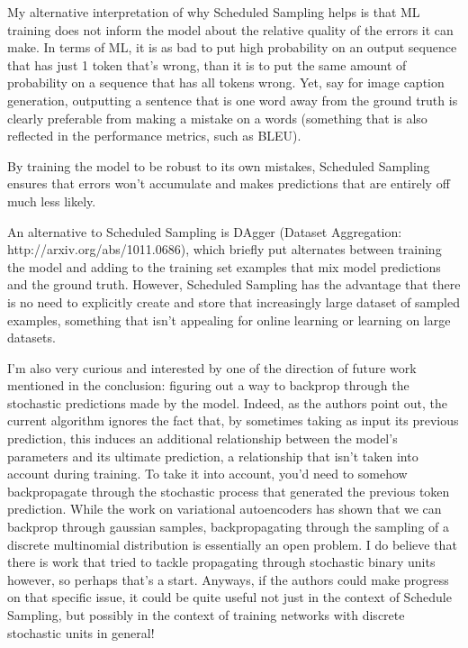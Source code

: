 \documentclass[10pt,a4paper]{ctexbook}
\begin{document}
My alternative interpretation of why Scheduled Sampling helps is that ML training does not inform the model about the relative quality of the errors it can make. In terms of ML, it is as bad to put high probability on an output sequence that has just 1 token that's wrong, than it is to put the same amount of probability on a sequence that has all tokens wrong. Yet, say for image caption generation, outputting a sentence that is one word away from the ground truth is clearly preferable from making a mistake on a words (something that is also reflected in the performance metrics, such as BLEU). 

By training the model to be robust to its own mistakes, Scheduled Sampling ensures that errors won't accumulate and makes predictions that are entirely off much less likely.

An alternative to Scheduled Sampling is DAgger (Dataset Aggregation: http://arxiv.org/abs/1011.0686), which briefly put alternates between training the model and adding to the training set examples that mix model predictions and the ground truth. However, Scheduled Sampling has the advantage that there is no need to explicitly create and store that increasingly large dataset of sampled examples, something that isn't appealing for online learning or learning on large datasets.

I'm also very curious and interested by one of the direction of future work mentioned in the conclusion: figuring out a way to backprop through the stochastic predictions made by the model. Indeed, as the authors point out, the current algorithm ignores the fact that, by sometimes taking as input its previous prediction, this induces an additional relationship between the model's parameters and its ultimate prediction, a relationship that isn't taken into account during training. To take it into account, you'd need to somehow backpropagate through the stochastic process that generated the previous token prediction. While the work on variational autoencoders has shown that we can backprop through gaussian samples, backpropagating through the sampling of a discrete multinomial distribution is essentially an open problem. I do believe that there is work that tried to tackle propagating through stochastic binary units however, so perhaps that's a start. Anyways, if the authors could make progress on that specific issue, it could be quite useful not just in the context of Schedule Sampling, but possibly in the context of training networks with discrete stochastic units in general!
\end{document}
